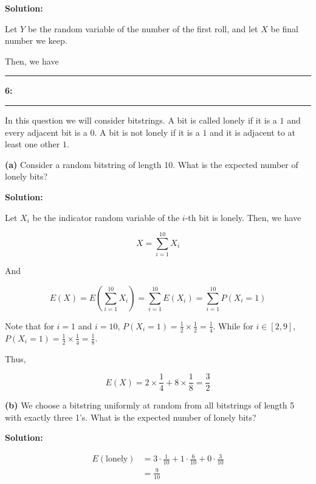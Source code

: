 \documentclass[11pt]{article}
\newcommand\question[2]{\vspace{.25in}\hrule\textbf{#1: #2}\vspace{.5em}\hrule\vspace{.10in}}
\renewcommand\part[1]{\vspace{.10in}\textbf{(#1)}}
\newcommand{\solution}{\vspace{.10in}\textbf{Solution: }}
\begin{document}
\solution

Let $Y$ be the random variable of the number of the first roll, and let $X$ be final number we keep.

Then, we have

\question{6}{}

In this question we will consider bitstrings. A bit is called lonely if it is a $1$ and every adjacent bit is a $0$. A bit is not lonely if it is a $1$ and it is adjacent to at least one other $1$.

\part{a}
Consider a random bitstring of length 10. What is the expected number of lonely bits?

\solution

Let $X_i$ be the indicator random variable of the $i$-th bit is lonely.
Then, we have

\begin{equation}
    X = \sum_{i=1}^{10} X_i 
\end{equation}

And

\begin{equation}
    E(X) = E\left(\sum_{i=1}^{10} X_i\right) = \sum_{i=1}^{10} E(X_i) = \sum_{i=1}^{10} P(X_i = 1)
\end{equation}

Note that for $i = 1$ and $i = 10$, $P(X_i = 1) = \frac{1}{2} \times \frac{1}{2} = \frac{1}{4}$.
While for $i \in [2, 9]$, $P(X_i = 1) = \frac{1}{2} \times \frac{1}{4} = \frac{1}{8}$.

Thus,

\begin{equation}
    E(X) = 2 \times \frac{1}{4} + 8 \times \frac{1}{8} = \frac{3}{2}
\end{equation}

\part{b} We choose a bitstring uniformly at random from all bitstrings of length 5 with exactly three 1's. What is the expected number of lonely bits?

\solution

\begin{align*}
    E(\text{lonely}) &= 3\cdot\frac{1}{10} + 1\cdot\frac{6}{10}+ 0\cdot\frac{3}{10}\\
                     &= \frac{9}{10} \\
\end{align*}
\end{document}
